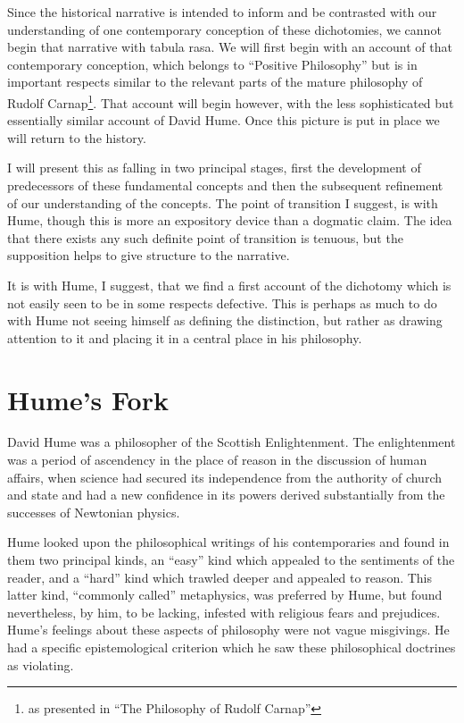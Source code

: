 Since the historical narrative is intended to inform and be contrasted
with our understanding of one contemporary conception of these
dichotomies, we cannot begin that narrative with tabula rasa.
We will first begin with an account of that contemporary conception,
which belongs to ``Positive Philosophy'' but is in important respects
similar to the relevant parts of the mature philosophy of Rudolf
Carnap\footnote{as presented in ``The Philosophy of Rudolf
Carnap''\cite{schilpp63}}.
That account will begin however, with the less sophisticated but
essentially similar account of David Hume.
Once this picture is put in place we will return to the history.

I will present this as falling in two principal stages, first the
development of predecessors of these fundamental concepts and then the
subsequent refinement of our understanding of the concepts.
The point of transition I suggest, is with Hume, though this is more
an expository device than a dogmatic claim.
The idea that there exists any such definite point of transition is
tenuous, but the supposition helps to give structure to the narrative.

It is with Hume, I suggest, that we find a first account of the
dichotomy which is not easily seen to be in some respects defective. 
This is perhaps as much to do with Hume not seeing himself as defining
the distinction, but rather as drawing attention to it and placing it
in a central place in his philosophy. 

\section{Hume's Fork}\label{HumesFork}

David Hume was a philosopher of the Scottish Enlightenment.
The enlightenment was a period of ascendency in the place of reason in
the discussion of human affairs, when science had secured its
independence from the authority of church and state and had a new
confidence in its powers derived substantially from the successes of
Newtonian physics.

Hume looked upon the philosophical writings of his contemporaries and
found in them two principal kinds, an ``easy'' kind which appealed to
the sentiments of the reader, and a ``hard'' kind which trawled deeper
and appealed to reason.
This latter kind, ``commonly called'' metaphysics, was preferred by
Hume, but found nevertheless, by him, to be lacking, infested with religious 
fears and prejudices.
Hume's feelings about these aspects of philosophy were not vague
misgivings.
He had a specific epistemological criterion which he saw these
philosophical doctrines as violating.

